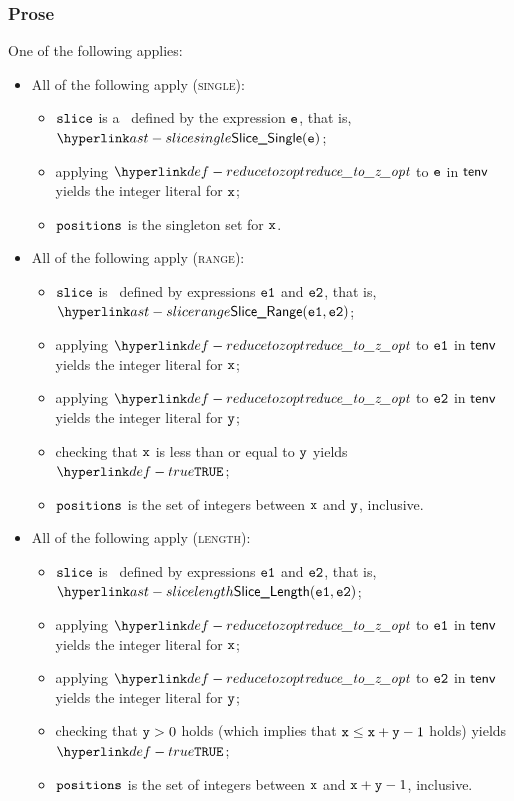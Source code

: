 \subsubsection{Prose}
One of the following applies:
\begin{itemize}
  \item All of the following apply (\textsc{single}):
  \begin{itemize}
    \item $\texttt{slice}$ is a \singleslice\ defined by the expression $\texttt{e}$, that is, $\SliceSingle(\ve)$;
    \item applying $\reducetozopt$ to $\texttt{e}$ in $\textsf{tenv}$ yields the integer literal for $\texttt{x}$\ProseTerminateAs{\None};
    \item $\texttt{positions}$ is the singleton set for $\texttt{x}$.
  \end{itemize}

  \item All of the following apply (\textsc{range}):
  \begin{itemize}
    \item $\texttt{slice}$ is \rangeslice\ defined by expressions $\texttt{e1}$ and $\texttt{e2}$, that is, \\
          $\SliceRange(\veone, \vetwo)$;
    \item applying $\reducetozopt$ to $\texttt{e1}$ in $\textsf{tenv}$ yields the integer literal for $\texttt{x}$\ProseTerminateAs{\None};
    \item applying $\reducetozopt$ to $\texttt{e2}$ in $\textsf{tenv}$ yields the integer literal for $\texttt{y}$\ProseTerminateAs{\None};
    \item checking that $\texttt{x}$ is less than or equal to $\texttt{y}$ yields $\True$\ProseTerminateAs{\BadSlices};
    \item $\texttt{positions}$ is the set of integers between $\texttt{x}$ and $\texttt{y}$, inclusive.
  \end{itemize}

  \item All of the following apply (\textsc{length}):
  \begin{itemize}
    \item $\texttt{slice}$ is \lengthslice\ defined by expressions $\texttt{e1}$ and $\texttt{e2}$, that is, \\
          $\SliceLength(\veone, \vetwo)$;
    \item applying $\reducetozopt$ to $\texttt{e1}$ in $\textsf{tenv}$ yields the integer literal for $\texttt{x}$\ProseTerminateAs{\None};
    \item applying $\reducetozopt$ to $\texttt{e2}$ in $\textsf{tenv}$ yields the integer literal for $\texttt{y}$\ProseTerminateAs{\None};
    \item checking that $\texttt{y} > 0$ holds (which implies that $\texttt{x} \leq \texttt{x}+\texttt{y}-1$ holds) yields $\True$\ProseTerminateAs{\BadSlices};
    \item $\texttt{positions}$ is the set of integers between $\texttt{x}$ and $\texttt{x}+\texttt{y}-1$, inclusive.
  \end{itemize}


\end{itemize}
